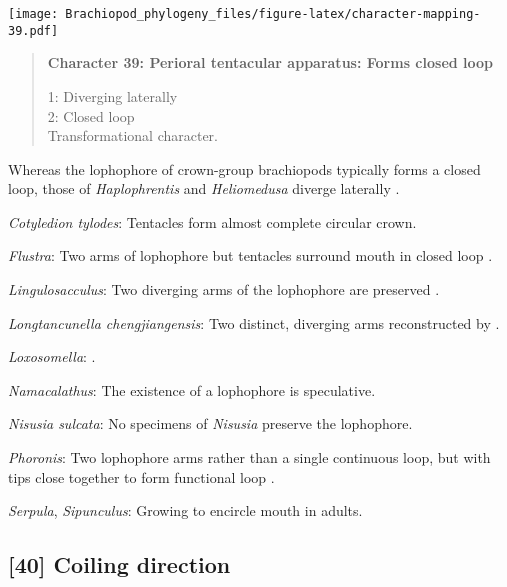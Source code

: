 \documentclass[openany]{book}
\theoremstyle{definition}
\theoremstyle{definition}
\theoremstyle{definition}
\theoremstyle{remark}
\begin{document}
\texttt{[image: Brachiopod\_phylogeny\_files/figure-latex/character-mapping-39.pdf]}

\begin{quote}
\textbf{Character 39: Perioral tentacular apparatus: Forms closed loop}

1: Diverging laterally\\
2: Closed loop\\
Transformational character.
\end{quote}

Whereas the lophophore of crown-group brachiopods typically forms a
closed loop, those of \emph{Haplophrentis} and \emph{Heliomedusa}
diverge laterally \citep{Moysiuk2017Hyolithsare}.

\hypertarget{Cotyledion_tylodes-coding-39}{}
\emph{Cotyledion tylodes}: Tentacles form almost complete circular
crown.

\hypertarget{Flustra-coding-39}{}
\emph{Flustra}: Two arms of lophophore but tentacles surround mouth in
closed loop \citep{Schwaha2015}.

\hypertarget{Lingulosacculus-coding-39}{}
\emph{Lingulosacculus}: Two diverging arms of the lophophore are
preserved \citep{Balthasar2009EarlyCambrian}.

\hypertarget{Longtancunella_chengjiangensis-coding-39}{}
\emph{Longtancunella chengjiangensis}: Two distinct, diverging arms
reconstructed by \citet{Zhang2007Agregarious}.

\hypertarget{Loxosomella-coding-39}{}
\emph{Loxosomella}: \citet{Nielsen1966}.

\hypertarget{Namacalathus-coding-39}{}
\emph{Namacalathus}: The existence of a lophophore is speculative.

\hypertarget{Nisusia_sulcata-coding-39}{}
\emph{Nisusia sulcata}: No specimens of \emph{Nisusia} preserve the
lophophore.

\hypertarget{Phoronis-coding-39}{}
\emph{Phoronis}: Two lophophore arms rather than a single continuous
loop, but with tips close together to form functional loop
\citep{Torrey1901}.

\hypertarget{Serpula-coding-39}{}
\emph{Serpula}, \emph{Sipunculus}: Growing to encircle mouth in adults.

\subsection*{{[}40{]} Coiling direction}\label{coiling-direction}
\end{document}
